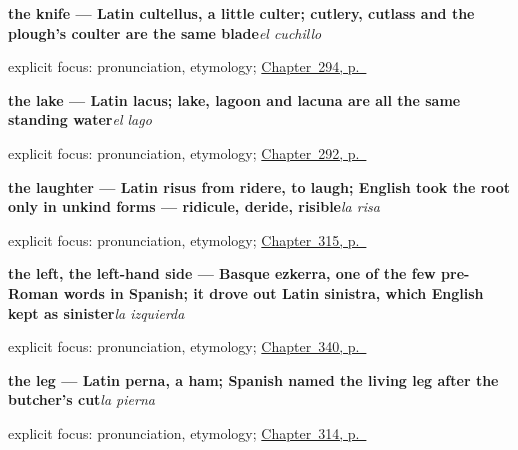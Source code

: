 \noindent\begin{minipage}[t]{\linewidth}
\raggedright
\textbf{the knife — Latin cultellus, a little culter; cutlery, cutlass and the plough's coulter are the same blade}\enspace\emph{el cuchillo}\par
\footnotesize explicit focus: pronunciation, etymology; \hyperref[ch:cinco-cosas-mas]{Chapter~294, p.~\pageref*{ch:cinco-cosas-mas}}
\end{minipage}\par\smallskip

\noindent\begin{minipage}[t]{\linewidth}
\raggedright
\textbf{the lake — Latin lacus; lake, lagoon and lacuna are all the same standing water}\enspace\emph{el lago}\par
\footnotesize explicit focus: pronunciation, etymology; \hyperref[ch:la-tierra]{Chapter~292, p.~\pageref*{ch:la-tierra}}
\end{minipage}\par\smallskip

\noindent\begin{minipage}[t]{\linewidth}
\raggedright
\textbf{the laughter — Latin risus from ridere, to laugh; English took the root only in unkind forms — ridicule, deride, risible}\enspace\emph{la risa}\par
\footnotesize explicit focus: pronunciation, etymology; \hyperref[ch:fuerza-y-risa]{Chapter~315, p.~\pageref*{ch:fuerza-y-risa}}
\end{minipage}\par\smallskip

\noindent\begin{minipage}[t]{\linewidth}
\raggedright
\textbf{the left, the left-hand side — Basque ezkerra, one of the few pre-Roman words in Spanish; it drove out Latin sinistra, which English kept as sinister}\enspace\emph{la izquierda}\par
\footnotesize explicit focus: pronunciation, etymology; \hyperref[ch:cerca-y-lejos]{Chapter~340, p.~\pageref*{ch:cerca-y-lejos}}
\end{minipage}\par\smallskip

\noindent\begin{minipage}[t]{\linewidth}
\raggedright
\textbf{the leg — Latin perna, a ham; Spanish named the living leg after the butcher's cut}\enspace\emph{la pierna}\par
\footnotesize explicit focus: pronunciation, etymology; \hyperref[ch:brazo-y-pie]{Chapter~314, p.~\pageref*{ch:brazo-y-pie}}
\end{minipage}\par\smallskip

